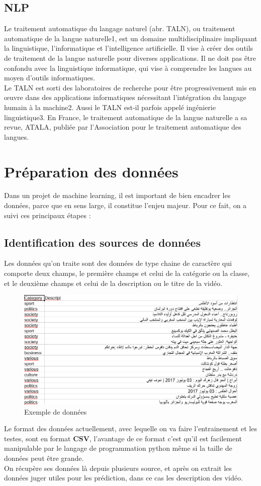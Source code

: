 \subsection{NLP}
Le traitement automatique du langage naturel (abr. TALN), ou traitement automatique de la langue naturelle1, est un domaine multidisciplinaire impliquant la linguistique, l'informatique et l'intelligence artificielle. Il vise à créer des outils de traitement de la langue naturelle pour diverses applications. Il ne doit pas être confondu avec la linguistique informatique, qui vise à comprendre les langues au moyen d'outils informatiques.\\[0.5cm]
Le TALN est sorti des laboratoires de recherche pour être progressivement mis en œuvre dans des applications informatiques nécessitant l'intégration du langage humain à la machine2. Aussi le TALN est-il parfois appelé ingénierie linguistique3. En France, le traitement automatique de la langue naturelle a sa revue, ATALA, publiée par l’Association pour le traitement automatique des langues.




\section{Préparation des données}	
Dans un projet de machine learning, il est important de bien encadrer les données, parce que en sens large, il constitue l'enjeu majeur. Pour ce fait, on a suivi ces principaux étapes :
\subsection{Identification des sources de données}
Les données qu'on traite sont des données de type chaine de caractère qui comporte deux champs, le première champs et celui de la catégorie ou la classe, et le deuxième champs et celui de la description ou le titre de la vidéo.
\begin{figure}[H]
	\includegraphics[width=\linewidth]{Images/donnees_contenu.png}
	\caption{Exemple de données}
	\label{fig:donnees}
\end{figure}	
Le format des données actuellement, avec lequelle on va faire l'entrainement et les testes, sont en format \textbf{CSV}, l'avantage de ce format c'est qu'il est facilement manipulable par le langage de programmation python même si la taille de données peut être grande.\\[0.2cm]
On récupère ses données là depuis plusieurs source, et après on extrait les données juger utiles pour les prédiction, dans ce cas les description des vidéo.
